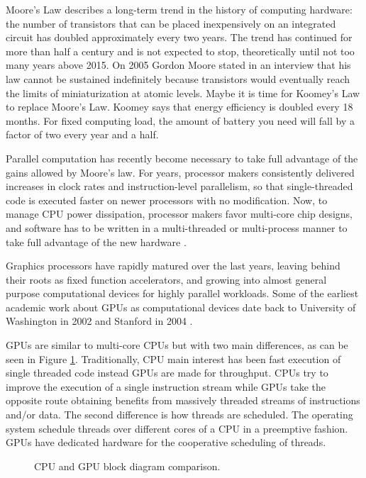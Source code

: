 \documentclass[review]{elsarticle}
\begin{document}
Moore's Law describes a long-term trend in the history of computing
hardware: the number of transistors that can be placed inexpensively
on an integrated circuit has doubled approximately every two
years. The trend has continued for more than half a century and is not
expected to stop, theoretically until not too many years above
2015. On 2005 Gordon Moore stated in an interview that his law cannot
be sustained indefinitely because transistors would eventually reach
the limits of miniaturization at atomic levels. Maybe it is time for
Koomey's Law \cite{10.1109/MAHC.2010.28} to replace Moore's
Law. Koomey says that energy efficiency is doubled every 18
months. For fixed computing load, the amount of battery you need will
fall by a factor of two every year and a half.

Parallel computation has recently become necessary to take full
advantage of the gains allowed by Moore's law. For years, processor
makers consistently delivered increases in clock rates and
instruction-level parallelism, so that single-threaded code is
executed faster on newer processors with no modification. Now, to
manage CPU power dissipation, processor makers favor multi-core chip
designs, and software has to be written in a multi-threaded or
multi-process manner to take full advantage of the new hardware \cite{6307773}.

Graphics processors have rapidly matured over the last years, leaving
behind their roots as fixed function accelerators, and growing into
almost general purpose computational devices for highly parallel
workloads. Some of the earliest academic work about GPUs as
computational devices date back to University of Washington in 2002
\cite{Thompson:2002:UMG:774861.774894} and Stanford in 2004
\cite{Buck:2004:BGS:1015706.1015800}.  %

GPUs are similar to multi-core CPUs but with two main differences,
as can be seen in Figure \ref{fig:cpu-gpu}. Traditionally, CPU
main interest has been fast execution of single threaded code instead
GPUs are made for throughput. CPUs try to improve the execution of a
single instruction stream while GPUs take the opposite route obtaining
benefits from massively threaded streams of instructions and/or
data. The second difference is how threads are scheduled. The
operating system schedule threads over different cores of a CPU in a
preemptive fashion. GPUs have dedicated hardware for the cooperative
scheduling of threads. 

\begin{figure}[!ht]
\centering
{}
\caption{CPU and GPU block diagram comparison.}
\label{fig:cpu-gpu}
\end{figure}
\end{document}
